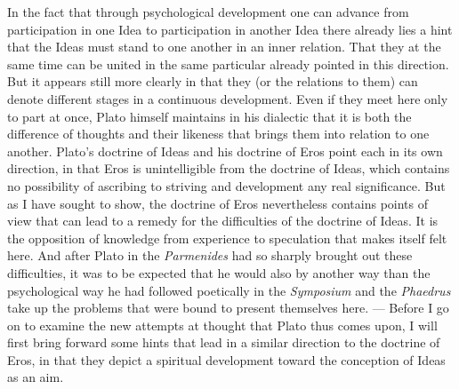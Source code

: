 \documentclass[12pt,a4paper,openany]{book}
\newcommand{\opage}[1]{\marginnote{\footnotesize\textit{[#1]}}}
\begin{document}
In the fact that through psychological development one can advance
from participation in one Idea to participation in another
Idea there already lies a hint that the Ideas
must stand to one another in an inner relation.  That they at the same time
can be united in the same particular already pointed in this
\setcounter{footnote}{0}%
\opage{48}direction.  But it appears still more clearly in that they
(or the relations to them) can denote different stages in
a continuous development.  Even if they meet here only to
part at once, Plato himself maintains in his dialectic
that it is both the difference of thoughts and their likeness
that brings them into relation to one another.  Plato's doctrine of Ideas
and his doctrine of Eros point each in its own direction, in that Eros
is unintelligible from the doctrine of Ideas, which contains no
possibility of ascribing to striving and development any
real significance.  But as I have sought to show, the
doctrine of Eros nevertheless contains points of view that can lead
to a remedy for the difficulties of the doctrine of Ideas.  It is the opposition of
knowledge from experience to speculation that makes itself felt here.  And after Plato in the \textit{Parmenides} had so
sharply brought out these difficulties, it was to be expected
that he would also by another way than the psychological
way he had followed poetically in the \textit{Symposium} and the \textit{Phaedrus}
take up the problems that were bound to present themselves here. ---
Before I go on to examine the new attempts at thought
that Plato thus comes upon, I will first bring forward
some hints that lead in a similar direction to the doctrine
of Eros, in that they depict a spiritual development toward the conception of Ideas
as an aim.
\end{document}

